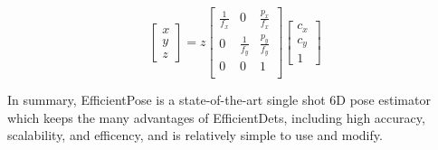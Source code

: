 \begin{equation}
    \begin{bmatrix}
        x\\y\\z
    \end{bmatrix}
    =z
    \begin{bmatrix}
        \frac{1}{f_x} & 0 & \frac{p_x}{f_x} \\
        0 & \frac{1}{f_y} & \frac{p_y}{f_y} \\
        0 & 0 & 1 \\
    \end{bmatrix}
    \begin{bmatrix}
        c_x\\c_y\\1
    \end{bmatrix}
\end{equation}

In summary, EfficientPose is a state-of-the-art single shot 6D pose estimator which keeps the many advantages of EfficientDets, including high accuracy, scalability, and efficency, and is relatively simple to use and modify.